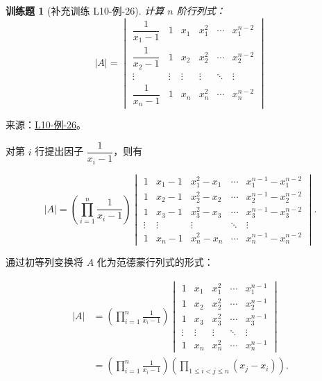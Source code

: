 \documentclass[UTF8,12pt,a4paper,fontset=fandol]{ctexart}
\newtheorem{exercise}{训练题}[section]
\begin{document}
\begin{exercise}[补充训练 L10-例-26]\label{prob:L10-例-26}
计算 $n$ 阶行列式：
    \[
        |A| = \begin{vmatrix}
            \dfrac{1}{x_1 - 1} & 1      & x_1    & x_1^2  & \cdots & x_1^{n-2} \\[1.2em]
            \dfrac{1}{x_2 - 1} & 1      & x_2    & x_2^2  & \cdots & x_2^{n-2} \\[1.2em]
            \vdots             & \vdots & \vdots & \vdots & \ddots & \vdots    \\[1.2em]
            \dfrac{1}{x_n - 1} & 1      & x_n    & x_n^2  & \cdots & x_n^{n-2}
        \end{vmatrix}
    \]
\end{exercise}
\noindent 来源：\href{https://github.com/yhwu-is/Linear-Algebra-Left-Undone/blob/new/%E8%AE%B2%E4%B9%89/%E4%B8%93%E9%A2%98/10%20%E8%A1%8C%E5%88%97%E5%BC%8F.tex}{L10-例-26}。
\begin{solve}
对第 $i$ 行提出因子 $\dfrac{1}{x_i-1}$，则有

    \[
        |A| = \left(\displaystyle\prod_{i=1}^n \frac{1}{x_i-1} \right) \begin{vmatrix}
            1 & x_1 - 1 & x_1^2 - x_1 & \cdots & x_1^{n-1} - x_1^{n-2} \\
            1 & x_2 - 1 & x_2^2 - x_2 & \cdots & x_2^{n-1} - x_2^{n-2} \\
            1 & x_3 - 1 & x_3^2 - x_3 & \cdots & x_3^{n-1} - x_3^{n-2} \\
            \vdots & \vdots & \vdots & \ddots & \vdots \\
            1 & x_n - 1 & x_n^2 - x_n & \cdots & x_n^{n-1} - x_n^{n-2}
        \end{vmatrix}.
    \]

    通过初等列变换将 $A$ 化为范德蒙行列式的形式：

    \begin{align*}
        |A| &= \left(\displaystyle\prod_{i=1}^n \frac{1}{x_i-1} \right) \begin{vmatrix}
            1 & x_1 & x_1^2 & \cdots & x_1^{n-1} \\
            1 & x_2 & x_2^2 & \cdots & x_2^{n-1} \\
            1 & x_3 & x_3^2 & \cdots & x_3^{n-1} \\
            \vdots & \vdots & \vdots & \ddots & \vdots \\
            1 & x_n & x_n^2 & \cdots & x_n^{n-1}
        \end{vmatrix} \\
        &= \left(\displaystyle\prod_{i=1}^n \frac{1}{x_i-1} \right)
           \left(\displaystyle\prod_{1 \leqslant i < j \leqslant n} (x_j - x_i)\right).
    \end{align*}
\end{solve}
\end{document}
